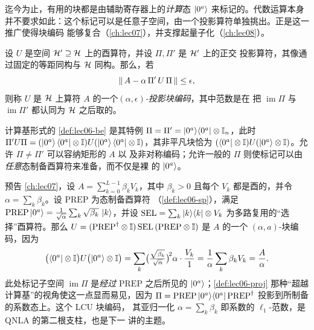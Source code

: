 迄今为止，有用的块都是由辅助寄存器上的\emph{计算}态 $\ket{0^a}$ 来标记的。代数运算本身
并不要求如此：这个标记可以是任意子空间，由一个投影算符单独挑出。正是这一推广使得块编码
能够复合（\cref{ch:lec07}），并支撑起量子化（\cref{ch:lec08}）。

\begin{definition}[投影（广义）块编码]
\label{def:lec06-proj}
设 $U$ 是空间 $\mathcal{H}'\supseteq\mathcal{H}$ 上的酉算符，并设 $\Pi,\Pi'$ 是 $\mathcal{H}'$ 上的正交
投影算符，其像通过固定的等距同构与 $\mathcal{H}$ 同构。那么，若
\begin{equation}
  \left\lVert \,A-\alpha\,\Pi'\,U\,\Pi\, \right\rVert\le\epsilon,
  \label{eq:lec06-projdef}
\end{equation}
则称 $U$ 是 $\mathcal{H}$ 上算符 $A$ 的一个\emph{$(\alpha,\epsilon)$-投影块编码}，其中范数是在
把 $\operatorname{im}\Pi$ 与 $\operatorname{im}\Pi'$ 都认同为 $\mathcal{H}$ 之后取的。
\end{definition}

计算基形式的 \cref{def:lec06-be} 是其特例
$\Pi=\Pi'=\ket{0^a}\!\bra{0^a}\otimes\mathbb{I}_n$，此时
$\Pi'U\Pi=(\ket{0^a}\bra{0^a}\otimes\mathbb{I})U
(\ket{0^a}\bra{0^a}\otimes\mathbb{I})$，其非平凡块恰为
$(\bra{0^a}\otimes\mathbb{I})U(\ket{0^a}\otimes\mathbb{I})$。允许 $\Pi\neq\Pi'$ 可以容纳矩形的 $A$ 以
及非对称编码；允许一般的 $\Pi$ 则使标记可以由\emph{任意}态制备酉算符来准备，而不仅是裸
的 $\ket{0^a}$。

\begin{example}
\label{exa:lec06-lcu}
预告 \cref{ch:lec07}，设 $A=\sum_{k=0}^{L-1}\beta_k V_k$，其中 $\beta_k>0$ 且每个 $V_k$
都是酉的，并令 $\alpha=\sum_k\beta_k$。设 $\mathrm{PREP}$ 为态制备酉算符
（\cref{def:lec06-sp}），满足
$\mathrm{PREP}\ket{0^a}=\frac{1}{\sqrt\alpha}\sum_k\sqrt{\beta_k}\,\ket{k}$，并设
$\mathrm{SEL}=\sum_k\ket{k}\!\bra{k}\otimes V_k$ 为多路复用的``选择''酉算符。那么
$U=(\mathrm{PREP}^{\dagger}\otimes\mathbb{I})\,\mathrm{SEL}\,(\mathrm{PREP}\otimes\mathbb{I})$ 是 $A$ 的一个
$(\alpha,a)$-块编码，因为
\[
  \bigl(\bra{0^a}\otimes\mathbb{I}\bigr)U\bigl(\ket{0^a}\otimes\mathbb{I}\bigr)
  =\sum_k\bigl(\tfrac{\sqrt{\beta_k}}{\sqrt\alpha}\bigr)^{\!2}\alpha\cdot
   \frac{V_k}{1}
  =\frac{1}{\alpha}\sum_k\beta_k V_k=\frac{A}{\alpha}.
\]
此处标记子空间 $\operatorname{im}\Pi$ 是\emph{经过} $\mathrm{PREP}$ 之后所见的
$\ket{0^a}$；\cref{def:lec06-proj} 那种``超越计算基''的视角使这一点显而易见，因为
$\Pi=\mathrm{PREP}\ket{0^a}\!\bra{0^a}\mathrm{PREP}^{\dagger}$ 投影到所制备的系数态上。这个 LCU 块编码，
其亚归一化 $\alpha=\sum_k\beta_k$ 即系数的 $\ell_1$-范数，是 QNLA 的第二根支柱，也是下一
讲的主题。
\end{example}

